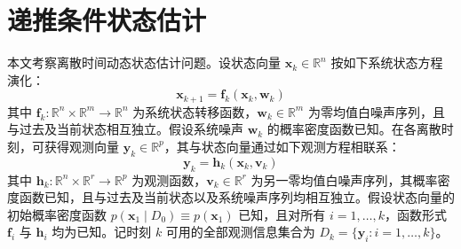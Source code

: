 \section{递推条件状态估计}\label{sec:bayes}

本文考察离散时间动态状态估计问题。设状态向量 $\bm{x}_k \in \mathbb{R}^n$ 按如下系统状态方程演化：
\begin{equation}\label{eq:1}
\bm{x}_{k+1} = \bm{f}_k(\bm{x}_k, \bm{w}_k)
\end{equation}
其中 $\bm{f}_k : \mathbb{R}^n \times \mathbb{R}^m \to \mathbb{R}^n$ 为系统状态转移函数，$\bm{w}_k \in \mathbb{R}^m$ 为零均值白噪声序列，且与过去及当前状态相互独立。假设系统噪声 $\bm{w}_k$ 的概率密度函数已知。在各离散时刻，可获得观测向量 $\bm{y}_k \in \mathbb{R}^p$，其与状态向量通过如下观测方程相联系：
\begin{equation}\label{eq:2}
\bm{y}_k = \bm{h}_k(\bm{x}_k, \bm{v}_k)
\end{equation}
其中 $\bm{h}_k : \mathbb{R}^n \times \mathbb{R}^r \to \mathbb{R}^p$ 为观测函数，$\bm{v}_k \in \mathbb{R}^r$ 为另一零均值白噪声序列，其概率密度函数已知，且与过去及当前状态以及系统噪声序列均相互独立。假设状态向量的初始概率密度函数 $p(\bm{x}_1 \mid D_0) \equiv p(\bm{x}_1)$ 已知，且对所有 $i = 1, \dots, k$，函数形式 $\bm{f}_i$ 与 $\bm{h}_i$ 均为已知。记时刻 $k$ 可用的全部观测信息集合为 $D_k = \{\bm{y}_i : i = 1, \dots, k\}$。

